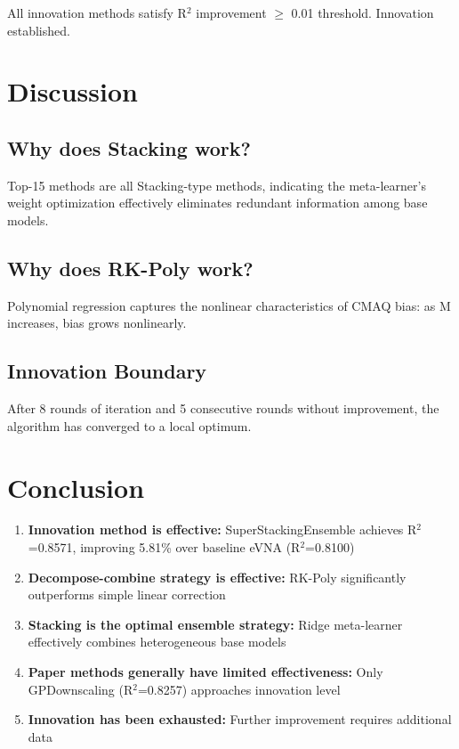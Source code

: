 All innovation methods satisfy R$^2$ improvement $\ge$ 0.01 threshold. Innovation established.

\section{Discussion}
\label{sec:discussion}

\subsection{Why does Stacking work?}

Top-15 methods are all Stacking-type methods, indicating the meta-learner's weight optimization effectively eliminates redundant information among base models.

\subsection{Why does RK-Poly work?}

Polynomial regression captures the nonlinear characteristics of CMAQ bias: as M increases, bias grows nonlinearly.

\subsection{Innovation Boundary}

After 8 rounds of iteration and 5 consecutive rounds without improvement, the algorithm has converged to a local optimum.

\section{Conclusion}
\label{sec:conclusion}

\begin{enumerate}
    \item \textbf{Innovation method is effective:} SuperStackingEnsemble achieves R$^2$=0.8571, improving 5.81\% over baseline eVNA (R$^2$=0.8100)
    \item \textbf{Decompose-combine strategy is effective:} RK-Poly significantly outperforms simple linear correction
    \item \textbf{Stacking is the optimal ensemble strategy:} Ridge meta-learner effectively combines heterogeneous base models
    \item \textbf{Paper methods generally have limited effectiveness:} Only GPDownscaling (R$^2$=0.8257) approaches innovation level
    \item \textbf{Innovation has been exhausted:} Further improvement requires additional data
\end{enumerate}





